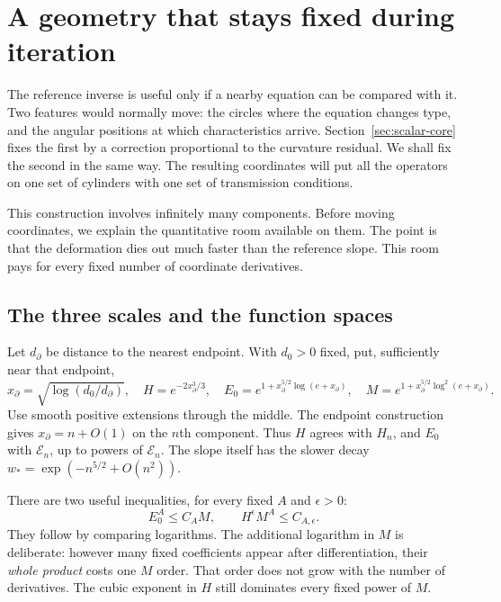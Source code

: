 \section{A geometry that stays fixed during iteration}
\label{sec:fixed-geometry}
\label{sec:rosen-physical-grading}
\label{sec:optical-graph-height}
\label{sec:pp-positive-exact-poisson}

The reference inverse is useful only if a nearby equation can be compared
with it. Two features would normally move: the circles where the equation
changes type, and the angular positions at which characteristics arrive.
Section~\ref{sec:scalar-core} fixes the first by a correction proportional
to the curvature residual. We shall fix the second in the same way.
The resulting coordinates will put all the operators on one set of
cylinders with one set of transmission conditions.

This construction involves infinitely many components. Before moving
coordinates, we explain the quantitative room available on them. The
point is that the deformation dies out much faster than the reference
slope. This room pays for every fixed number of coordinate derivatives.

\subsection{The three scales and the function spaces}

Let $d_\partial$ be distance to the nearest endpoint. With $d_0>0$ fixed,
put, sufficiently near that endpoint,
\begin{equation}\label{eq:readable-physical-weights}
 x_\partial=\sqrt{\log(d_0/d_\partial)},\quad
 H=e^{-2x_\partial^3/3},\quad
 E_0=e^{1+x_\partial^{5/2}\log(e+x_\partial)},\quad
 M=e^{1+x_\partial^{5/2}\log^2(e+x_\partial)}.
\end{equation}
Use smooth positive extensions through the middle. The endpoint
construction gives $x_\partial=n+O(1)$ on the $n$th component. Thus
$H$ agrees with $H_n$, and $E_0$ with $\mathcal E_n$, up to powers of
$\mathcal E_n$. The slope itself has the slower decay
$w_*=\exp(-n^{5/2}+O(n^2))$.

There are two useful inequalities, for every fixed $A$ and $\epsilon>0$:
\begin{equation}\label{eq:full-material-envelope}
 E_0^A\le C_A M,\qquad H^\epsilon M^A\le C_{A,\epsilon}.
\end{equation}
They follow by comparing logarithms. The additional logarithm in $M$
is deliberate: however many fixed coefficients appear after
differentiation, their \emph{whole product} costs one $M$ order.
That order does not grow with the number of derivatives. The cubic
exponent in $H$ still dominates every fixed power of $M$.

